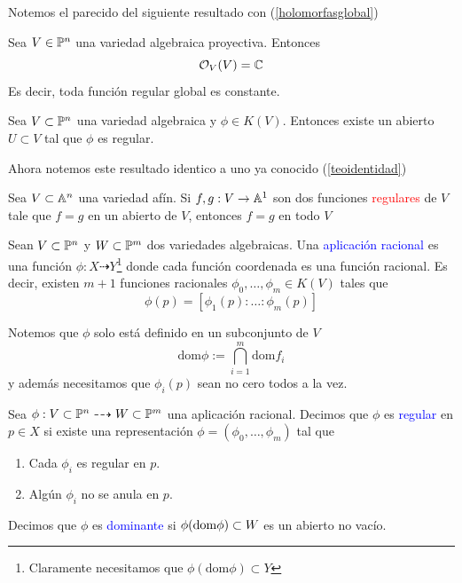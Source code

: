     Notemos el parecido del siguiente resultado con (\ref{holomorfasglobal})
    \begin{propo}
        Sea $V\in\mathbb{P}^n$ una variedad algebraica proyectiva. Entonces
        \begin{equation*}
            \mathcal{O}_V(V)=\mathbb{C}
        \end{equation*}
        Es decir, toda función regular global es constante.
    \end{propo}

    \begin{propo}
        Sea $V\subset\mathbb{P}^n$ una variedad algebraica y $\phi\in K(V)$. Entonces existe un abierto $U\subset V$ tal que $\phi$ es regular.
    \end{propo}

    Ahora notemos este resultado identico a uno ya conocido (\ref{teoidentidad})
    \begin{corollary}\label{teoindetidadvarafin}
        Sea $V\subset \mathbb{A}^n$ una variedad afín. Si $f,g:V\to \mathbb{A}^1$ son dos funciones \textcolor{red}{regulares} de $V$ tale que $f=g$ en un abierto de $V$, entonces $f=g$ en todo $V$
    \end{corollary}

    
    \begin{definition}
        Sean $V\subset\mathbb{P}^n$ y $W\subset\mathbb{P}^m$ dos variedades algebraicas. Una \textcolor{blue}{aplicación racional} es una función $\phi:X\dashrightarrow Y$\footnote{Claramente necesitamos que $\phi(\mathrm{dom}\phi)\subset Y$} donde cada función coordenada es una función racional. Es decir, existen $m+1$ funciones racionales $\phi_0,\dots,\phi_m\in K(V)$ tales que
        \begin{equation*}
            \phi(p)=[\phi_1(p):\dots:\phi_m(p)]
        \end{equation*}
    \end{definition}

    Notemos que $\phi$ solo está definido en un subconjunto de $V$
        \begin{equation*}
            \mathrm{dom}\phi:=\bigcap_{i=1}^m\mathrm{dom}f_i
        \end{equation*}
    y además necesitamos que $\phi_i(p)$ sean no cero todos a la vez.
    
    \begin{definition}
        Sea $\phi:V\subset\mathbb{P}^n\dashrightarrow W\subset\mathbb{P}^m$ una aplicación racional. Decimos que $\phi$ es \textcolor{blue}{regular} en $p\in X$ si existe una representación $\phi=(\phi_0,\dots,\phi_m)$ tal que
        \begin{enumerate}
            \item Cada $\phi_i$ es regular en $p$.
            \item Algún $\phi_i$ no se anula en $p$.
        \end{enumerate}
        Decimos que $\phi$ es \textcolor{blue}{dominante} si $\phi(\mathrm{dom}\phi)\subset W$ es un abierto no vacío.
    \end{definition}

